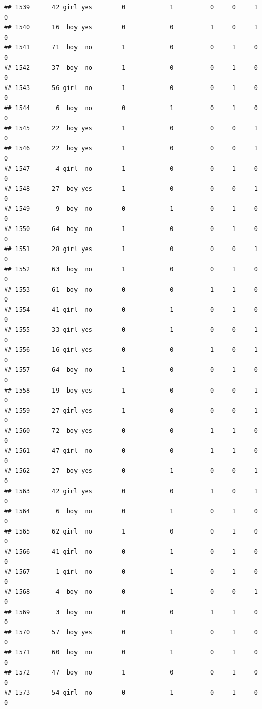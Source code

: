 \documentclass[man]{apa6}
\begin{document}
\begin{verbatim}
## 1539      42 girl yes        0            1          0     0     1     0
## 1540      16  boy yes        0            0          1     0     1     0
## 1541      71  boy  no        1            0          0     1     0     0
## 1542      37  boy  no        1            0          0     1     0     0
## 1543      56 girl  no        1            0          0     1     0     0
## 1544       6  boy  no        0            1          0     1     0     0
## 1545      22  boy yes        1            0          0     0     1     0
## 1546      22  boy yes        1            0          0     0     1     0
## 1547       4 girl  no        1            0          0     1     0     0
## 1548      27  boy yes        1            0          0     0     1     0
## 1549       9  boy  no        0            1          0     1     0     0
## 1550      64  boy  no        1            0          0     1     0     0
## 1551      28 girl yes        1            0          0     0     1     0
## 1552      63  boy  no        1            0          0     1     0     0
## 1553      61  boy  no        0            0          1     1     0     0
## 1554      41 girl  no        0            1          0     1     0     0
## 1555      33 girl yes        0            1          0     0     1     0
## 1556      16 girl yes        0            0          1     0     1     0
## 1557      64  boy  no        1            0          0     1     0     0
## 1558      19  boy yes        1            0          0     0     1     0
## 1559      27 girl yes        1            0          0     0     1     0
## 1560      72  boy yes        0            0          1     1     0     0
## 1561      47 girl  no        0            0          1     1     0     0
## 1562      27  boy yes        0            1          0     0     1     0
## 1563      42 girl yes        0            0          1     0     1     0
## 1564       6  boy  no        0            1          0     1     0     0
## 1565      62 girl  no        1            0          0     1     0     0
## 1566      41 girl  no        0            1          0     1     0     0
## 1567       1 girl  no        0            1          0     1     0     0
## 1568       4  boy  no        0            1          0     0     1     0
## 1569       3  boy  no        0            0          1     1     0     0
## 1570      57  boy yes        0            1          0     1     0     0
## 1571      60  boy  no        0            1          0     1     0     0
## 1572      47  boy  no        1            0          0     1     0     0
## 1573      54 girl  no        0            1          0     1     0     0

\end{verbatim}
\end{document}
